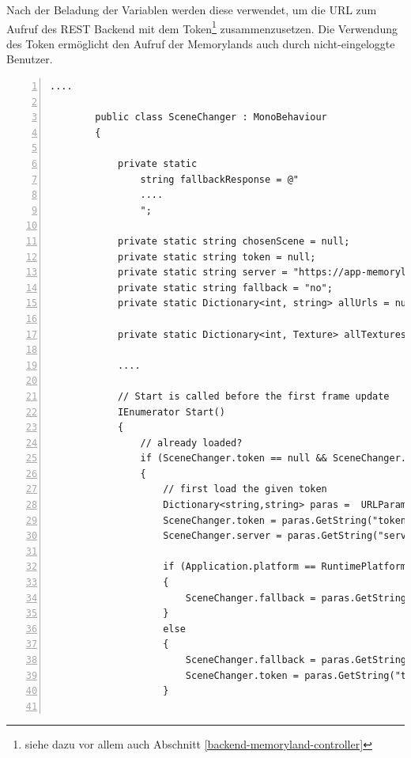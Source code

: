Nach der Beladung der Variablen werden diese verwendet, um die URL zum Aufruf des REST Backend mit dem Token\footnote{siehe dazu vor allem auch Abschnitt \ref{backend-memoryland-controller}} zusammenzusetzen. Die Verwendung des Token ermöglicht den Aufruf der Memorylands auch durch nicht-eingeloggte Benutzer.



\begin{lstlisting}[numbers=left,caption={SceneChanger},label={lst:unity-scene-changer-start}]
        ....
        
        public class SceneChanger : MonoBehaviour
        {
        
            private static 
                string fallbackResponse = @"
                ....
                ";
        
            private static string chosenScene = null;
            private static string token = null;
            private static string server = "https://app-memoryland.azurewebsites.net";
            private static string fallback = "no";
            private static Dictionary<int, string> allUrls = null;
        
            private static Dictionary<int, Texture> allTextures = new Dictionary<int, Texture> ();
        
            ....                
        
            // Start is called before the first frame update
            IEnumerator Start()
            {
                // already loaded?
                if (SceneChanger.token == null && SceneChanger.chosenScene == null) 
                {
                    // first load the given token
                    Dictionary<string,string> paras =  URLParameters.GetSearchParameters();
                    SceneChanger.token = paras.GetString("token", "");
                    SceneChanger.server = paras.GetString("server", "https://app-memoryland.azurewebsites.net");
                    
                    if (Application.platform == RuntimePlatform.WebGLPlayer)
                    {
                        SceneChanger.fallback = paras.GetString("fallback", "no");
                    }
                    else
                    {
                        SceneChanger.fallback = paras.GetString("fallback", "no");
                        SceneChanger.token = paras.GetString("token", "1920cf9e-b295-4c80-b347-75eff21a71f6");
                    }
                    

\end{lstlisting}
